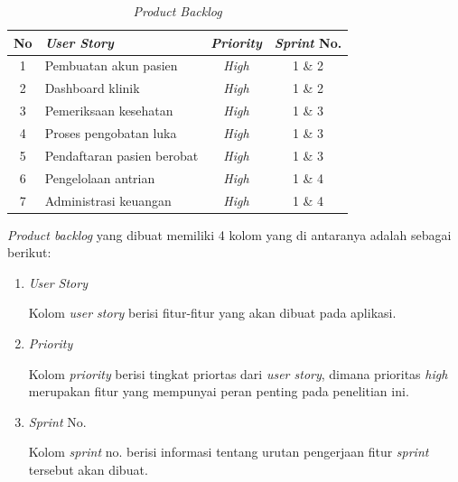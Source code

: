 \begin{table}[H]
	\centering
	\caption{\emph{Product Backlog}}
	\label{tabel_input}
	\begin{tabular}{|c|l|c|c|}
		\hline
		\textbf{No} & \textbf{\emph{User Story}} & \textbf{\emph{Priority}} & \textbf{\emph{Sprint} No.} \\
		\hline
		
		1 & 
		Pembuatan akun pasien & \emph{High}
		& 1 \& 2 \\
		\hline
		
		2 & 
		Dashboard klinik  & \emph{High}
		& 1 \& 2 \\
		\hline
		
		3 & 
		Pemeriksaan kesehatan & \emph{High}
		& 1 \& 3 \\
		\hline
		
		4 & 
		Proses pengobatan luka & \emph{High}
		& 1 \& 3 \\
		\hline
		
		5 & 
		Pendaftaran pasien berobat & \emph{High}
		& 1 \& 3 \\
		\hline
		
		6 & 
		Pengelolaan antrian & \emph{High}
		& 1 \& 4 \\
		\hline
		
		7 & 
		Administrasi keuangan  & \emph{High}
		& 1 \& 4 \\
		\hline
		
	\end{tabular}
\end{table}

\emph{Product backlog} yang dibuat memiliki 4 kolom yang di antaranya adalah sebagai berikut:

\begin{enumerate}
	\item \emph{User Story}
	
	Kolom \emph{user story} berisi fitur-fitur yang akan dibuat pada aplikasi.
	
	\item \emph{Priority}
	
	Kolom \emph{priority} berisi tingkat priortas dari \emph{user story}, dimana prioritas \emph{high} merupakan fitur yang mempunyai peran penting pada penelitian ini.
	
	\item \emph{Sprint} No.
	
	Kolom \emph{sprint} no. berisi informasi tentang urutan pengerjaan fitur \emph{sprint} tersebut akan dibuat.
\end{enumerate}

